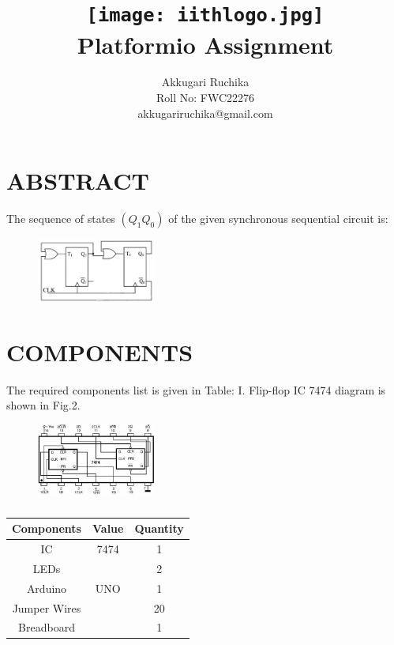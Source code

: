 \documentclass[conference]{IEEEtran}
\title{
\vspace{1cm}
{\texttt{[image: iithlogo.jpg]} \\ Platformio Assignment} }
\author{Akkugari Ruchika \\ Roll No: FWC22276 \\ akkugariruchika@gmail.com}
\begin{document}
\maketitle
 \section {ABSTRACT}
 The sequence of states $(Q_{1}Q_{0})$ of the given synchronous sequential circuit is:
 \begin {figure}[h]
 \centering
 \includegraphics[width=0.35\textwidth]{pltio.jpg}
 \caption{\label{fig: Sequential Circuit}}
 \end {figure}
\section{COMPONENTS}
The required components list is given in Table: I. Flip-flop IC 7474 diagram is shown in Fig.2.
\begin{figure}[h]
\centering
\includegraphics[width=0.35\textwidth]{7474ic.jpg}
\caption{\label{fig:Gates}}
\end{figure}
 \begin{table} [htbp]
\centering
\begin{tabular}{| c | c | c |} \hline
Components & Value & Quantity \\\hline
IC & 7474 & 1 \\ \hline
LEDs &  & 2 \\ \hline
Arduino & UNO & 1 \\ \hline
Jumper Wires &  & 20 \\ \hline
Breadboard & & 1 \\ 
\hline
\end{tabular}
\vspace{0.1cm}
\caption{\label{tab:widgets}}
\end{table}\\
\end{document}
